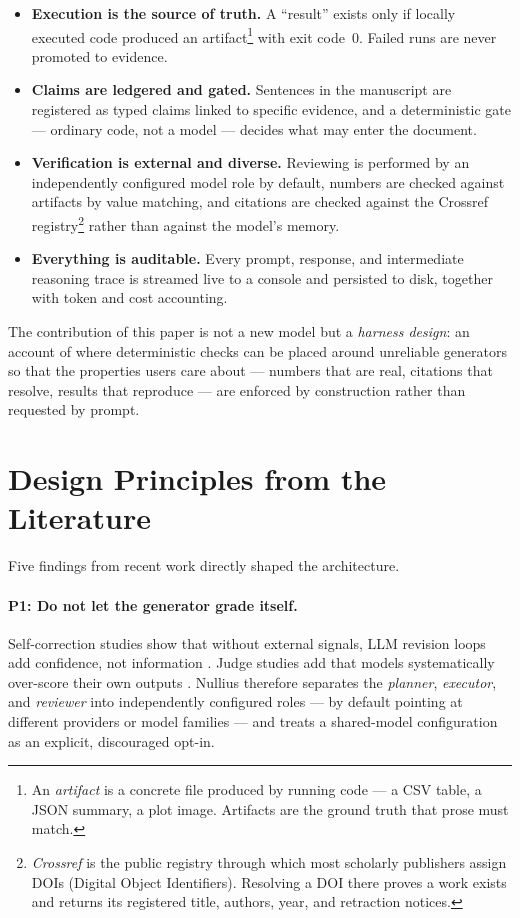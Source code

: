 \documentclass[11pt]{article}
\begin{document}
\begin{itemize}
  \item \textbf{Execution is the source of truth.} A ``result'' exists only if locally executed code produced an artifact\footnote{An \emph{artifact} is a concrete file produced by running code --- a CSV table, a JSON summary, a plot image. Artifacts are the ground truth that prose must match.} with exit code~0. Failed runs are never promoted to evidence.
  \item \textbf{Claims are ledgered and gated.} Sentences in the manuscript are registered as typed claims linked to specific evidence, and a deterministic gate --- ordinary code, not a model --- decides what may enter the document.
  \item \textbf{Verification is external and diverse.} Reviewing is performed by an independently configured model role by default, numbers are checked against artifacts by value matching, and citations are checked against the Crossref registry\footnote{\emph{Crossref} is the public registry through which most scholarly publishers assign DOIs (Digital Object Identifiers). Resolving a DOI there proves a work exists and returns its registered title, authors, year, and retraction notices.} rather than against the model's memory.
  \item \textbf{Everything is auditable.} Every prompt, response, and intermediate reasoning trace is streamed live to a console and persisted to disk, together with token and cost accounting.
\end{itemize}

The contribution of this paper is not a new model but a \emph{harness design}: an account of where deterministic checks can be placed around unreliable generators so that the properties users care about --- numbers that are real, citations that resolve, results that reproduce --- are enforced by construction rather than requested by prompt.

\section{Design Principles from the Literature}
\label{sec:principles}

Five findings from recent work directly shaped the architecture.

\paragraph{P1: Do not let the generator grade itself.}
Self-correction studies show that without external signals, LLM revision loops add confidence, not information \cite{huang2024}. Judge studies add that models systematically over-score their own outputs \cite{self-pref}. Nullius therefore separates the \emph{planner}, \emph{executor}, and \emph{reviewer} into independently configured roles --- by default pointing at different providers or model families --- and treats a shared-model configuration as an explicit, discouraged opt-in.
\end{document}
